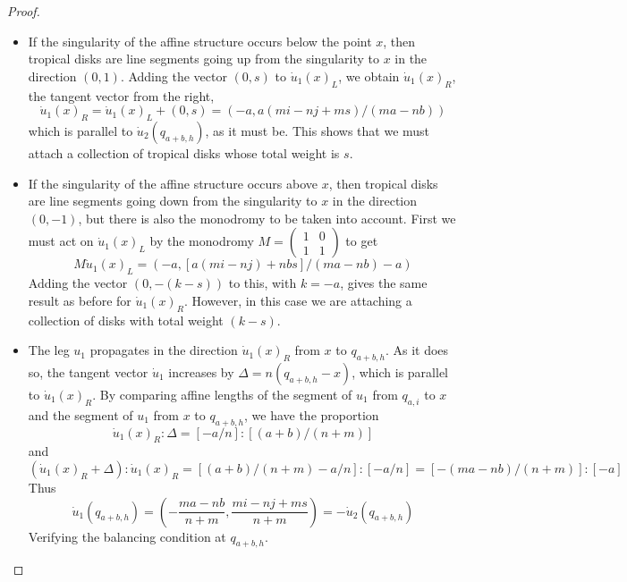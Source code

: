\documentclass[12pt]{amsart}
\begin{document}
\begin{proof}
\begin{itemize}
\item If the singularity of the affine structure occurs below the
  point $x$, then tropical disks are line segments going up from the singularity to $x$ in the direction
  $(0,1)$.  Adding the vector $(0,s)$ to $\dot{u}_1(x)_L$, we obtain
  $\dot{u}_1(x)_R$, the tangent vector from the right,
  \begin{equation}
    \dot{u}_1(x)_R = \dot{u}_1(x)_L + (0,s) = (-a, a(mi-nj+ms)/(ma-nb))
  \end{equation}
  which is parallel to $\dot{u}_2(q_{a+b,h})$, as it must be. This
  shows that we must attach a collection of tropical disks whose total
  weight is $s$.
  
\item If the singularity of the affine structure occurs above $x$,
  then tropical disks are line segments going down from the singularity to $x$ in the direction $(0,-1)$, but there
  is also the monodromy to be taken into account. First we must act on
  $\dot{u}_1(x)_L$ by the monodromy
  $M=\begin{pmatrix}1&0\\1&1\end{pmatrix}$ to get
  \begin{equation}
    M\dot{u}_1(x)_L = (-a,[a(mi-nj)+nbs]/(ma-nb) - a) 
  \end{equation}
  Adding the vector $(0,-(k-s))$ to this, with $k = -a$, gives the
  same result as before for $\dot{u}_1(x)_R$. However, in this case we
  are attaching a collection of disks with total weight $(k-s)$. 

\item The leg $u_1$ propagates in the direction $\dot{u}_1(x)_R$ from
  $x$ to $q_{a+b,h}$. As it does so, the tangent vector $\dot{u}_1$
  increases by $\Delta = n(q_{a+b,h} - x)$, which is parallel to
  $\dot{u}_1(x)_R$. By comparing affine lengths of the segment of $u_1$ from $q_{a,i}$ to $x$ and the segment of $u_1$ from $x$ to $q_{a+b,h}$, we have the proportion
  \begin{equation}
    \dot{u}_1(x)_R:\Delta = [-a/n] : [(a+b)/(n+m)]
  \end{equation}
  and 
  \begin{equation}
    (\dot{u}_1(x)_R + \Delta):\dot{u}_1(x)_R = [(a+b)/(n+m) - a/n]:[-a/n] = [-(ma-nb)/(n+m)]:[-a]
  \end{equation}
  Thus 
  \begin{equation}
    \dot{u}_1(q_{a+b,h}) =
    \left(-\frac{ma-nb}{n+m},\frac{mi-nj+ms}{n+m}\right) = -\dot{u}_2(q_{a+b,h})
  \end{equation}
  Verifying the balancing condition at $q_{a+b,h}$.
\end{itemize}


\end{proof}
\end{document}
